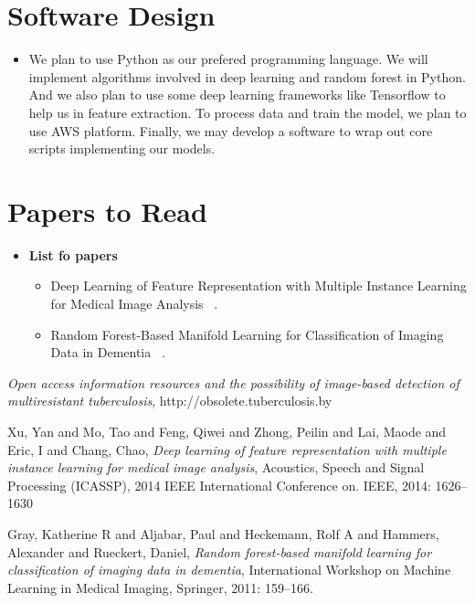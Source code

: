 \documentclass[letterpaper, 11pt]{article}
\begin{document}
\section{Software Design}
\begin{itemize}
\item
We plan to use Python as our prefered programming language. We will implement algorithms involved in deep learning and random forest in Python. And we also plan to use some deep learning frameworks like Tensorflow to help us in feature extraction. To process data and train the model, we plan to use AWS platform. Finally, we may develop a software to wrap out core scripts implementing our models.
\end{itemize}


\section{Papers to Read}
\begin{itemize}
\item
	\textbf{List fo papers}
	
	\begin{itemize}
	\item
		Deep Learning of Feature Representation with Multiple Instance Learning for Medical Image Analysis
		~\cite{DepplearningFeatureRepresentation}.
		
	\item
		Random Forest-Based Manifold Learning for Classification of Imaging Data in Dementia
		~\cite{RandomForestManifoldLearning}.
	\end{itemize}
\end{itemize}


\begin{thebibliography}{1}
\textit{Open access information resources and the possibility of image-based detection of multiresistant tuberculosis}, http://obsolete.tuberculosis.by

Xu, Yan and Mo, Tao and Feng, Qiwei and Zhong, Peilin and Lai, Maode and Eric, I and Chang, Chao, \textit{Deep learning of feature representation with multiple instance learning for medical image analysis}, Acoustics, Speech and Signal Processing (ICASSP), 2014 IEEE International Conference on. IEEE, 2014: 1626--1630

Gray, Katherine R and Aljabar, Paul and Heckemann, Rolf A and Hammers, Alexander and Rueckert, Daniel, \textit{Random forest-based manifold learning for classification of imaging data in dementia}, International Workshop on Machine Learning in Medical Imaging, Springer, 2011: 159--166.
\end{thebibliography}
\end{document}
